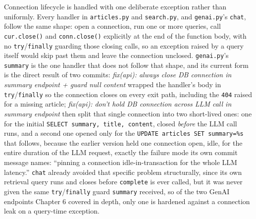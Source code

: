 \begin{sloppypar}
Connection lifecycle is handled with one deliberate exception rather than uniformly. Every handler in \texttt{articles.py} and \texttt{search.py}, and \texttt{genai.py}'s \texttt{chat}, follow the same shape: open a connection, run one or more queries, call \texttt{cur.close()} and \texttt{conn.close()} explicitly at the end of the function body, with no \texttt{try}/\texttt{finally} guarding those closing calls, so an exception raised by a query itself would skip past them and leave the connection unclosed. \texttt{genai.py}'s \texttt{summary} is the one handler that does not follow that shape, and its current form is the direct result of two commits: \textit{fix(api): always close DB connection in summary endpoint + guard null content} wrapped the handler's body in \texttt{try}/\texttt{finally} so the connection closes on every exit path, including the \texttt{404} raised for a missing article; \textit{fix(api): don't hold DB connection across LLM call in summary endpoint} then split that single connection into two short-lived ones: one for the initial \texttt{SELECT summary, title, content}, closed \emph{before} the LLM call runs, and a second one opened only for the \texttt{UPDATE articles SET summary=\%s} that follows, because the earlier version held one connection open, idle, for the entire duration of the LLM request, exactly the failure mode its own commit message names: ``pinning a connection idle-in-transaction for the whole LLM latency.'' \texttt{chat} already avoided that specific problem structurally, since its own retrieval query runs and closes before \texttt{complete} is ever called, but it was never given the same \texttt{try}/\texttt{finally} guard \texttt{summary} received, so of the two GenAI endpoints Chapter 6 covered in depth, only one is hardened against a connection leak on a query-time exception.
\end{sloppypar}

